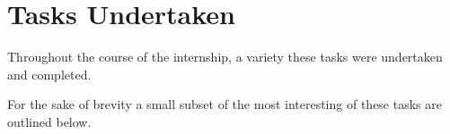 \chapter{Tasks Undertaken}


Throughout the course of the internship, a variety these tasks were undertaken and completed.  

For the sake of brevity a small subset of the most interesting of these tasks are outlined below. 